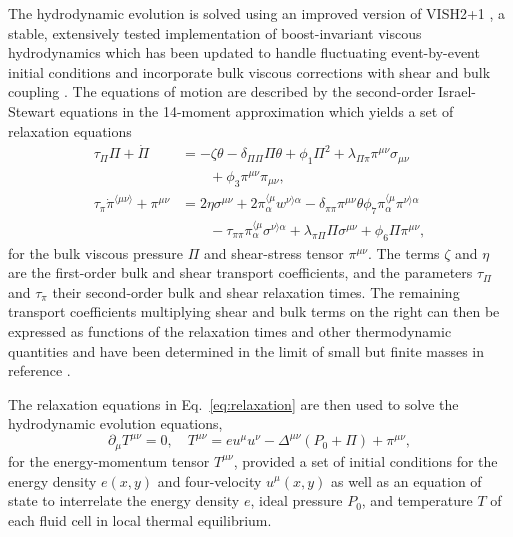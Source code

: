 \documentclass[aps,prc,reprint,amsmath,nofootinbib,superscriptaddress]{revtex4-1}
\begin{document}
The hydrodynamic evolution is solved using an improved version of VISH2+1 \cite{Song:2007ux}, a stable, extensively tested implementation of boost-invariant viscous hydrodynamics which has been updated to handle fluctuating event-by-event initial conditions \cite{Shen:2014vra} and incorporate bulk viscous corrections with shear and bulk coupling \cite{Denicol:2014vaa}.
The equations of motion are described by the second-order Israel-Stewart equations in the 14-moment approximation \cite{Stewart59, Israel43, ISRAEL1976213} which yields a set of relaxation equations
\begin{subequations}
  \begin{align}
    \tau_\Pi \Pi + \dot{\Pi} &=
      -\zeta \theta - \delta_{\Pi\Pi} \Pi\theta + \phi_1 \Pi^2
      + \lambda_{\Pi\pi} \pi^{\mu\nu} \sigma_{\mu\nu} \nonumber \\
      &\qquad + \phi_3 \pi^{\mu\nu}\pi_{\mu\nu}, \\
    \tau_\pi \dot{\pi}^{\langle \mu\nu \rangle} + \pi^{\mu\nu} &=
      2\eta\sigma^{\mu\nu} + 2\pi_\alpha^{\langle \mu} w^{\nu \rangle \alpha}
      - \delta_{\pi\pi} \pi^{\mu\nu} \theta \phi_7 \pi_\alpha^{\langle \mu}
        \pi^{\nu \rangle \alpha} \nonumber \\
      &\qquad - \tau_{\pi\pi} \pi_\alpha^{\langle \mu}\sigma^{\nu \rangle \alpha}
      + \lambda_{\pi\Pi} \Pi \sigma^{\mu\nu} + \phi_6 \Pi \pi^{\mu\nu},
  \end{align}
  \label{eq:relaxation}
\end{subequations}
for the bulk viscous pressure $\Pi$ and shear-stress tensor $\pi^{\mu\nu}$.
The terms $\zeta$ and $\eta$ are the first-order bulk and shear transport coefficients, and the parameters $\tau_\Pi$ and $\tau_\pi$ their second-order bulk and shear relaxation times.
The remaining transport coefficients multiplying shear and bulk terms on the right can then be expressed as functions of the relaxation times and other thermodynamic quantities and have been determined in the limit of small but finite masses in reference \cite{Denicol:2014vaa}.

The relaxation equations in Eq.~\eqref{eq:relaxation} are then used to solve the hydrodynamic evolution equations,
\begin{equation}
  \partial_\mu T^{\mu\nu} = 0, \quad T^{\mu\nu} = e u^\mu u^\nu  - \Delta^{\mu\nu} (P_0 + \Pi) + \pi^{\mu\nu},
  \label{eq:conservation}
\end{equation}
for the energy-momentum tensor $T^{\mu\nu}$, provided a set of initial conditions for the energy density $e(x,y)$ and four-velocity $u^\mu(x,y)$ as well as an equation of state to interrelate the energy density $e$, ideal pressure $P_0$, and temperature $T$ of each fluid cell in local thermal equilibrium.
\end{document}
